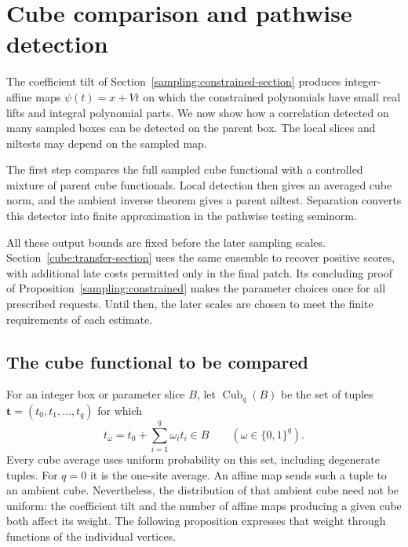\section{Cube comparison and pathwise detection}
\label{cube:section}

The coefficient tilt of Section~\ref{sampling:constrained-section}
produces integer-affine maps $\psi(t)=x+Vt$ on which the constrained
polynomials have small real lifts and integral polynomial parts.
We now show how a correlation detected on many sampled boxes can
be detected on the parent box. The local slices and niltests may
depend on the sampled map.

The first step compares the full sampled cube functional with a
controlled mixture of parent cube functionals. Local detection
then gives an averaged cube norm, and the ambient inverse theorem
gives a parent niltest. Separation converts this detector into
finite approximation in the pathwise testing seminorm.

All these output bounds are fixed before the later sampling scales.
Section~\ref{cube:transfer-section} uses the same ensemble to
recover positive scores, with additional late costs permitted only
in the final patch. Its concluding proof of
Proposition~\ref{sampling:constrained} makes the parameter choices
once for all prescribed requests. Until then, the later scales are
chosen to meet the finite requirements of each estimate.

\subsection{The cube functional to be compared}

For an integer box or parameter slice $B$, let
$\operatorname{Cub}_q(B)$ be the set of tuples
$\mathbf t=(t_0,t_1,\ldots,t_q)$ for which
\[
 t_\omega=t_0+\sum_{i=1}^q\omega_i t_i\in B
 \qquad(\omega\in\{0,1\}^q).
\]
Every cube average uses uniform probability on this set, including
degenerate tuples. For $q=0$ it is the one-site average.
An affine map sends such a tuple to an ambient cube. Nevertheless,
the distribution of that ambient cube need not be uniform: the
coefficient tilt and the number of affine maps producing a given
cube both affect its weight. The following proposition expresses
that weight through functions of the individual vertices.

